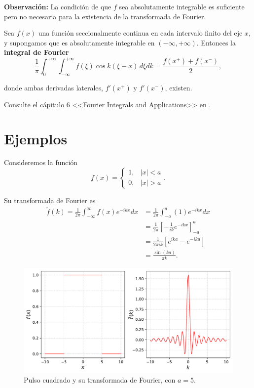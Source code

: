 \textbf{Observación:} La condición de que $f$ sea absolutamente integrable es suficiente pero no necesaria para la existencia de la transformada de Fourier.

\begin{teorema}
    Sea $f(x)$ una función seccionalmente continua en cada intervalo finito del eje $x$, y supongamos que es absolutamente integrable en $(-\infty, + \infty)$. Entonces la \textbf{integral de Fourier}
$$
\frac{1}{\pi} \int_0^{+\infty} \int_{-\infty}^{+\infty} f(\xi) \cos k(\xi-x) \,d\xi dk = \frac{f(x^+) + f(x^-)}{2},
$$

donde ambas derivadas laterales, $f'(x^+)$ y $f'(x^-)$, existen.
\end{teorema}

\begin{demo}
Consulte el cápitulo 6 <<Fourier Integrals and Applications>> en \cite{Brown}.
\end{demo}

\section{Ejemplos}

\begin{ejemplo} \label{PulsoCuadrado}
Consideremos la función 
$$f(x) = \left\{ \begin{array}{cl}
     1,& |x|<a  \\
     0,& |x|> a
\end{array} \right..$$

Su transformada de Fourier es 
\begin{align}
    \tilde{f}(k) = \frac{1}{2\pi} \int_{-\infty}^{\infty} f(x) e^{-ikx} dx &= \frac{1}{2\pi}\int_{-a}^a (1)  e^{-ikx} dx \nonumber \\
    &= \frac{1}{2\pi} \left[ - \frac{1}{ik} e^{-ikx} \right]_{-a}^a \nonumber\\
    &= \frac{1}{2\pi i k} [e^{ika} - e^{-ika}] \nonumber\\
    &= \frac{\sin(ka)}{\pi k}. \label{TransPulsoCuadrado}
\end{align}

\begin{figure}[H]
    \centering
    \includegraphics[scale = 0.55]{Figuras/EjemploTransformada1.pdf}
    \caption{Pulso cuadrado y su transformada de Fourier, con $a = 5$.}
    \label{Espectro2}
\end{figure}

\end{ejemplo}

